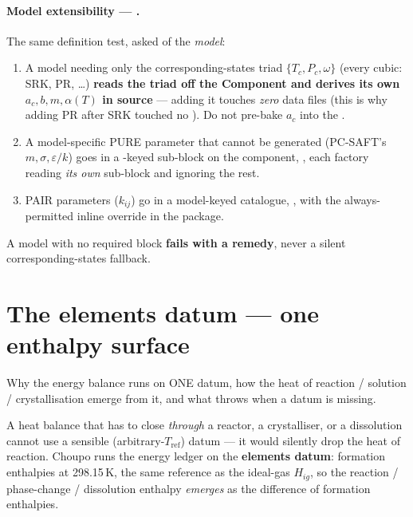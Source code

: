 \documentclass[11pt,a4paper]{article}
\begin{document}
\paragraph{Model extensibility --- .}
The same definition test, asked of the \emph{model}:
\begin{enumerate}[leftmargin=*,nosep]
  \item A model needing only the corresponding-states triad \(\{T_c, P_c,
        \omega\}\) (every cubic: SRK, PR, \dots) \textbf{reads the triad off the
        Component and derives its own \(a_c, b, m, \alpha(T)\) in source} ---
        adding it touches \emph{zero} data files (this is why adding PR after
        SRK touched no ).  Do not pre-bake \(a_c\) into the
        .
  \item A model-specific PURE parameter that cannot be generated (PC-SAFT's
        \(m, \sigma, \varepsilon/k\)) goes in a -keyed sub-block on
        the component, , each factory
        reading \emph{its own} sub-block and ignoring the rest.
  \item PAIR parameters (\(k_{ij}\)) go in a model-keyed catalogue,
        , with
        the always-permitted inline override in the package.
\end{enumerate}
A model with no required  block \textbf{fails with a
remedy}, never a silent corresponding-states fallback.

\section{The elements datum --- one enthalpy surface}\label{sec:energy-datum}

\begin{whatyoulllearn}
Why the energy balance runs on ONE datum, how the heat of reaction / solution /
crystallisation emerge from it, and what throws when a datum is missing.
\end{whatyoulllearn}

A heat balance that has to close \emph{through} a reactor, a crystalliser, or a
dissolution cannot use a sensible (arbitrary-\(T_{\mathrm{ref}}\)) datum --- it
would silently drop the heat of reaction.  Choupo runs the energy ledger on the
\textbf{elements datum}: formation enthalpies at 298.15\,K, the same reference
as the ideal-gas \(H_{ig}\), so the reaction / phase-change / dissolution
enthalpy \emph{emerges} as the difference of formation enthalpies.
\end{document}
